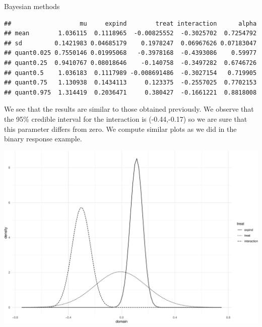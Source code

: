 \documentclass[
  ignorenonframetext,
]{beamer}
\begin{document}
\begin{frame}[fragile]{Bayesian methods}
\begin{verbatim}
##                   mu     expind        treat interaction      alpha
## mean        1.036115  0.1118965  -0.00825552  -0.3025702  0.7254792
## sd         0.1421983 0.04685179    0.1978247  0.06967626 0.07183047
## quant0.025 0.7550146 0.01995068   -0.3978168  -0.4393086    0.59977
## quant0.25  0.9410767 0.08018646    -0.140758  -0.3497282  0.6746726
## quant0.5    1.036183  0.1117989 -0.008691486  -0.3027154   0.719905
## quant0.75   1.130938  0.1434113     0.123375  -0.2557025  0.7702153
## quant0.975  1.314419  0.2036471     0.380427  -0.1661221  0.8818008
\end{verbatim}

\vspace{12pt}
\normalsize

We see that the results are similar to those obtained previously. We
observe that the 95\% credible interval for the interaction is
(-0.44,-0.17) so we are sure that this parameter differs from zero. We
compute similar plots as we did in the binary response example.
\end{frame}

\begin{frame}{}
\protect\hypertarget{section-13}{}
\includegraphics{week13p2_files/figure-beamer/unnamed-chunk-14-1.pdf}
\end{frame}
\end{document}
